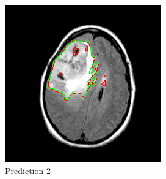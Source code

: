 \documentclass[11pt,a4paper]{article}
\begin{document}
\begin{figure}[H]
\begin{minipage}[t]{0.48\textwidth}
        \includegraphics[width=\linewidth]{../predictions/kaggle_3m/TCGA_DU_6408_19860521-32.png}
        \caption{Prediction 2}
        \label{fig:img_2}
    \end{minipage}
\end{figure}
\end{document}
